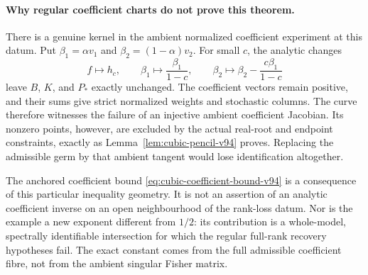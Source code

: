 \paragraph{Why regular coefficient charts do not prove this theorem.}
There is a genuine kernel in the ambient normalized coefficient
experiment at this datum. Put $\beta_1=\alpha v_1$ and
$\beta_2=(1-\alpha)v_2$. For small $c$, the analytic changes
\[
 f\longmapsto h_c,
 \qquad \beta_1\longmapsto\frac{\beta_1}{1-c},
 \qquad \beta_2\longmapsto\beta_2-\frac{c\beta_1}{1-c}
\]
leave $B$, $K$, and $P_*$ exactly unchanged. The coefficient vectors
remain positive, and their sums give strict normalized weights and
stochastic columns. The curve therefore witnesses the failure of an
injective ambient coefficient Jacobian. Its nonzero points, however,
are excluded by the actual real-root and endpoint constraints, exactly
as Lemma~\ref{lem:cubic-pencil-v94} proves. Replacing the admissible
germ by that ambient tangent would lose identification altogether.

The anchored coefficient bound \eqref{eq:cubic-coefficient-bound-v94}
is a consequence of this particular inequality geometry. It is not
an assertion of an analytic coefficient inverse on an open
neighbourhood of the rank-loss datum. Nor is the example a new exponent
different from $1/2$: its contribution is a whole-model, spectrally
identifiable intersection for which the regular full-rank recovery
hypotheses fail. The exact constant comes from the full admissible
coefficient fibre, not from the ambient singular Fisher matrix.

